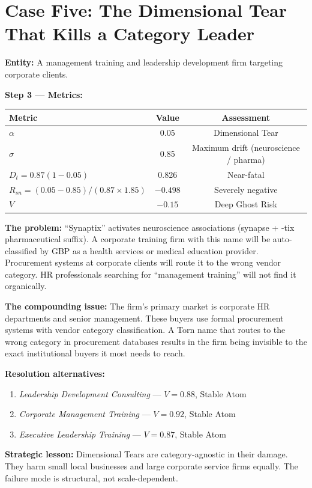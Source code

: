 \documentclass[12pt, openany]{book}
\theoremstyle{thmstyle}
\theoremstyle{defstyle}
\begin{document}
\section{Case Five: The Dimensional Tear That Kills a Category Leader}

\begin{casebox}
\textbf{Entity:} A management training and leadership development firm targeting corporate clients.

\textbf{Step 3 --- Metrics:}
\begin{center}
\begin{tabular}{lcc}
\toprule
Metric & Value & Assessment \\
\midrule
$\alpha$ & 0.05 & Dimensional Tear \\
$\sigma$ & 0.85 & Maximum drift (neuroscience / pharma) \\
$D_t = 0.87(1-0.05)$ & 0.826 & Near-fatal \\
$R_{sn} = (0.05-0.85)/(0.87 \times 1.85)$ & $-0.498$ & Severely negative \\
$V$ & $-0.15$ & Deep Ghost Risk \\
\bottomrule
\end{tabular}
\end{center}

\textbf{The problem:} ``Synaptix'' activates neuroscience associations (synapse + -tix pharmaceutical suffix). A corporate training firm with this name will be auto-classified by GBP as a health services or medical education provider. Procurement systems at corporate clients will route it to the wrong vendor category. HR professionals searching for ``management training'' will not find it organically.

\textbf{The compounding issue:} The firm's primary market is corporate HR departments and senior management. These buyers use formal procurement systems with vendor category classification. A Torn name that routes to the wrong category in procurement databases results in the firm being invisible to the exact institutional buyers it most needs to reach.

\textbf{Resolution alternatives:}
\begin{enumerate}[leftmargin=1.5em]
  \item \textit{Leadership Development Consulting} --- $V = 0.88$, Stable Atom
  \item \textit{Corporate Management Training} --- $V = 0.92$, Stable Atom
  \item \textit{Executive Leadership Training} --- $V = 0.87$, Stable Atom
\end{enumerate}

\textbf{Strategic lesson:} Dimensional Tears are category-agnostic in their damage. They harm small local businesses and large corporate service firms equally. The failure mode is structural, not scale-dependent.
\end{casebox}
\end{document}
